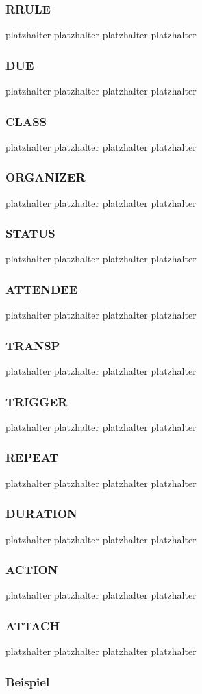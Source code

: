 \subsubsection{RRULE}
\label{sec:rrule}
platzhalter platzhalter platzhalter platzhalter 
\subsubsection{DUE}
\label{sec:due}
platzhalter platzhalter platzhalter platzhalter 
\subsubsection{CLASS}
\label{sec:class}
platzhalter platzhalter platzhalter platzhalter 
\subsubsection{ORGANIZER}
\label{sec:organizer}
platzhalter platzhalter platzhalter platzhalter 
\subsubsection{STATUS}
\label{sec:status}
platzhalter platzhalter platzhalter platzhalter 
\subsubsection{ATTENDEE}
\label{sec:attendee}
platzhalter platzhalter platzhalter platzhalter 
\subsubsection{TRANSP}
\label{sec:transp}
platzhalter platzhalter platzhalter platzhalter 
\subsubsection{TRIGGER}
\label{sec:trigger}
platzhalter platzhalter platzhalter platzhalter 
\subsubsection{REPEAT}
\label{sec:repeat}
platzhalter platzhalter platzhalter platzhalter 
\subsubsection{DURATION}
\label{sec:duration}
platzhalter platzhalter platzhalter platzhalter 
\subsubsection{ACTION}
\label{sec:action}
platzhalter platzhalter platzhalter platzhalter 
\subsubsection{ATTACH}
\label{sec:attach}
platzhalter platzhalter platzhalter platzhalter 
\subsubsection{Beispiel}
\label{sec:beispiel_ical}
